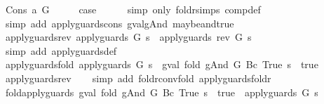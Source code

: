 \begin{isabellebody}
\ {\isacharparenleft}Cons\ a\ G{\isacharparenright}\isanewline
\ \ \isamarkupfalse%
\ \isamarkupfalse%
\ {\isacharquery}case\isanewline
\ \ \ \ \isamarkupfalse%
\ {\isacharparenleft}simp\ only{\isacharcolon}\ foldr{\isachardot}simps\ comp{\isacharunderscore}def{\isacharparenright}\isanewline
\ \ \ \ \isamarkupfalse%
\ {\isacharparenleft}simp\ add{\isacharcolon}\ apply{\isacharunderscore}guards{\isacharunderscore}cons\ gval{\isacharunderscore}gAnd\ maybe{\isacharunderscore}and{\isacharunderscore}true{\isacharparenright}\isanewline
{}\isamarkupfalse%
%
\endisatagproof
{\isafoldproof}%
%
\isadelimproof
\isanewline
%
\endisadelimproof
\isanewline
{}\isamarkupfalse%
\ apply{\isacharunderscore}guards{\isacharunderscore}rev{\isacharcolon}\ {\isachardoublequoteopen}apply{\isacharunderscore}guards\ G\ s\ {\isacharequal}\ apply{\isacharunderscore}guards\ {\isacharparenleft}rev\ G{\isacharparenright}\ s{\isachardoublequoteclose}\isanewline
%
\isadelimproof
\ \ %
\endisadelimproof
%
\isatagproof
{}\isamarkupfalse%
\ {\isacharparenleft}simp\ add{\isacharcolon}\ apply{\isacharunderscore}guards{\isacharunderscore}def{\isacharparenright}%
\endisatagproof
{\isafoldproof}%
%
\isadelimproof
\isanewline
%
\endisadelimproof
\isanewline
{}\isamarkupfalse%
\ apply{\isacharunderscore}guards{\isacharunderscore}fold{\isacharcolon}\ {\isachardoublequoteopen}apply{\isacharunderscore}guards\ G\ s\ {\isacharequal}\ {\isacharparenleft}gval\ {\isacharparenleft}fold\ gAnd\ G\ {\isacharparenleft}Bc\ True{\isacharparenright}{\isacharparenright}\ s\ {\isacharequal}\ true{\isacharparenright}{\isachardoublequoteclose}\isanewline
%
\isadelimproof
\ \ %
\endisadelimproof
%
\isatagproof
{}\isamarkupfalse%
\ apply{\isacharunderscore}guards{\isacharunderscore}rev\isanewline
\ \ \isamarkupfalse%
\ {\isacharparenleft}simp\ add{\isacharcolon}\ foldr{\isacharunderscore}conv{\isacharunderscore}fold\ apply{\isacharunderscore}guards{\isacharunderscore}foldr{\isacharparenright}%
\endisatagproof
{\isafoldproof}%
%
\isadelimproof
\isanewline
%
\endisadelimproof
\isanewline
{}\isamarkupfalse%
\ fold{\isacharunderscore}apply{\isacharunderscore}guards{\isacharcolon}\ {\isachardoublequoteopen}{\isacharparenleft}gval\ {\isacharparenleft}fold\ gAnd\ G\ {\isacharparenleft}Bc\ True{\isacharparenright}{\isacharparenright}\ s\ {\isacharequal}\ true{\isacharparenright}\ {\isacharequal}\ apply{\isacharunderscore}guards\ G\ s{\isachardoublequoteclose}\isanewline

\end{isabellebody}
